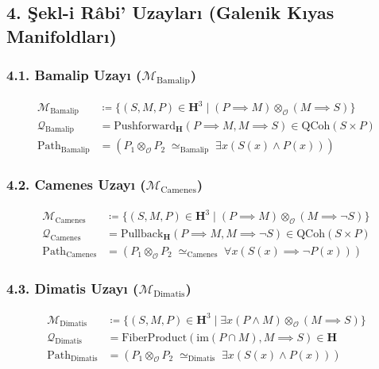 \documentclass[11pt, a4paper]{article}
\begin{document}
\subsection{4. Şekl-i Râbi' Uzayları (Galenik Kıyas Manifoldları)}

\subsubsection{4.1. Bamalip Uzayı ($\mathcal{M}_{\text{Bamalip}}$)}
\begin{align}
\mathcal{M}_{\text{Bamalip}} &\coloneqq \{ (S, M, P) \in \mathbf{H}^3 \mid (P \implies M) \otimes_{\mathcal{O}} (M \implies S) \} \\
\mathcal{Q}_{\text{Bamalip}} &= \text{Pushforward}_{\mathbf{H}}(P \implies M, M \implies S) \in \text{QCoh}(S \times P) \\
\text{Path}_{\text{Bamalip}} &= (P_1 \otimes_{\mathcal{O}} P_2 \;\simeq_{\text{Bamalip}}\; \exists x (S(x) \land P(x)))
\end{align}

\subsubsection{4.2. Camenes Uzayı ($\mathcal{M}_{\text{Camenes}}$)}
\begin{align}
\mathcal{M}_{\text{Camenes}} &\coloneqq \{ (S, M, P) \in \mathbf{H}^3 \mid (P \implies M) \otimes_{\mathcal{O}} (M \implies \neg S) \} \\
\mathcal{Q}_{\text{Camenes}} &= \text{Pullback}_{\mathbf{H}}(P \implies M, M \implies \neg S) \in \text{QCoh}(S \times P) \\
\text{Path}_{\text{Camenes}} &= (P_1 \otimes_{\mathcal{O}} P_2 \;\simeq_{\text{Camenes}}\; \forall x (S(x) \implies \neg P(x)))
\end{align}

\subsubsection{4.3. Dimatis Uzayı ($\mathcal{M}_{\text{Dimatis}}$)}
\begin{align}
\mathcal{M}_{\text{Dimatis}} &\coloneqq \{ (S, M, P) \in \mathbf{H}^3 \mid \exists x (P \land M) \otimes_{\mathcal{O}} (M \implies S) \} \\
\mathcal{Q}_{\text{Dimatis}} &= \text{FiberProduct}(\text{im}(P \cap M), M \implies S) \in \mathbf{H} \\
\text{Path}_{\text{Dimatis}} &= (P_1 \otimes_{\mathcal{O}} P_2 \;\simeq_{\text{Dimatis}}\; \exists x (S(x) \land P(x)))
\end{align}
\end{document}
